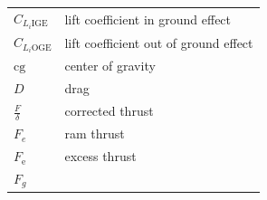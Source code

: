 \documentclass[
]{book}
\begin{document}
\begin{longtable}[]{@{}ll@{}}
\begin{minipage}[t]{0.14\columnwidth}\raggedright
\(C_{L_i \mathrm{IGE}}\)\strut
\end{minipage} & \begin{minipage}[t]{0.80\columnwidth}\raggedright
lift coefficient in ground effect\strut
\end{minipage}\tabularnewline
\begin{minipage}[t]{0.14\columnwidth}\raggedright
\(C_{L_i \mathrm{OGE}}\)\strut
\end{minipage} & \begin{minipage}[t]{0.80\columnwidth}\raggedright
lift coefficient out of ground effect\strut
\end{minipage}\tabularnewline
\begin{minipage}[t]{0.14\columnwidth}\raggedright
\(\mathrm{cg}\)\strut
\end{minipage} & \begin{minipage}[t]{0.80\columnwidth}\raggedright
center of gravity\strut
\end{minipage}\tabularnewline
\begin{minipage}[t]{0.14\columnwidth}\raggedright
\(D\)\strut
\end{minipage} & \begin{minipage}[t]{0.80\columnwidth}\raggedright
drag\strut
\end{minipage}\tabularnewline
\begin{minipage}[t]{0.14\columnwidth}\raggedright
\(\frac{F}{\delta}\)\strut
\end{minipage} & \begin{minipage}[t]{0.80\columnwidth}\raggedright
corrected thrust\strut
\end{minipage}\tabularnewline
\begin{minipage}[t]{0.14\columnwidth}\raggedright
\(F_e\)\strut
\end{minipage} & \begin{minipage}[t]{0.80\columnwidth}\raggedright
ram thrust\strut
\end{minipage}\tabularnewline
\begin{minipage}[t]{0.14\columnwidth}\raggedright
\(F_{\text{e}}\)\strut
\end{minipage} & \begin{minipage}[t]{0.80\columnwidth}\raggedright
excess thrust\strut
\end{minipage}\tabularnewline
\begin{minipage}[t]{0.14\columnwidth}\raggedright
\(F_g\)\strut
\end{minipage} & \begin{minipage}[t]{0.80\columnwidth}\raggedright

\end{minipage}
\end{longtable}
\end{document}
